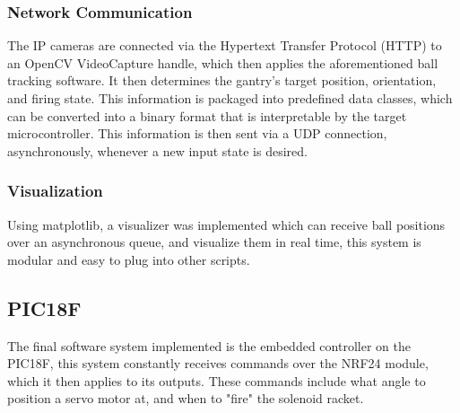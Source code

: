 \subsubsection{Network Communication}
The IP cameras are connected via the Hypertext Transfer Protocol (HTTP) to an OpenCV VideoCapture handle, which then applies the aforementioned ball tracking software. It then determines the gantry's target position, orientation, and firing state. This information is packaged into predefined data classes, which can be converted into a binary format that is interpretable by the target microcontroller. This information is then sent via a UDP connection, asynchronously, whenever a new input state is desired.

\subsubsection{Visualization}
Using matplotlib, a visualizer was implemented which can receive ball positions over an asynchronous queue, and visualize them in real time, this system is modular and easy to plug into other scripts.

\subsection{PIC18F}
The final software system implemented is the embedded controller on the PIC18F, this system constantly receives commands over the NRF24 module, which it then applies to its outputs. These commands include what angle to position a servo motor at, and when to "fire" the solenoid racket.


